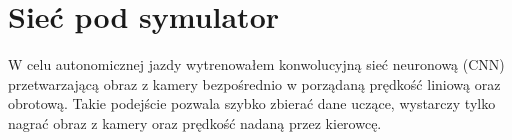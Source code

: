 \chapter{Sieć pod symulator}
W celu autonomicznej jazdy wytrenowałem konwolucyjną sieć neuronową (CNN)
przetwarzającą obraz z kamery bezpośrednio w porządaną prędkość liniową
oraz obrotową. Takie podejście pozwala szybko zbierać dane uczące, wystarczy
tylko nagrać obraz z kamery oraz prędkość nadaną przez kierowcę.
\begin{figure}[h]
  \centering
\end{figure}
